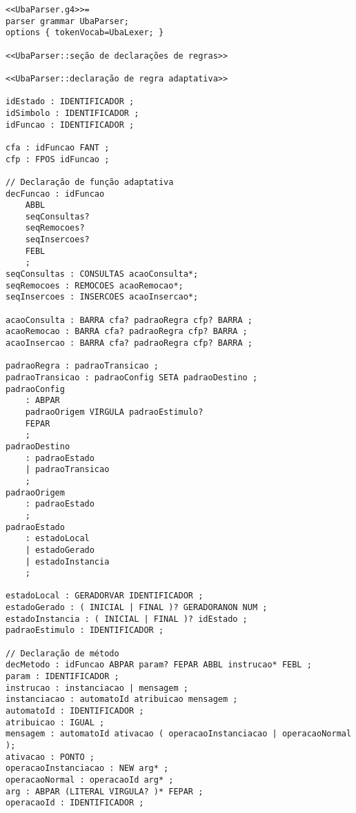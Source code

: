 
\begin{lstlisting}[style=antlr]
<<UbaParser.g4>>=
parser grammar UbaParser;
options { tokenVocab=UbaLexer; }

<<UbaParser::seção de declarações de regras>>

<<UbaParser::declaração de regra adaptativa>>

idEstado : IDENTIFICADOR ;
idSimbolo : IDENTIFICADOR ;
idFuncao : IDENTIFICADOR ;

cfa : idFuncao FANT ;
cfp : FPOS idFuncao ;

// Declaração de função adaptativa
decFuncao : idFuncao
	ABBL
	seqConsultas?
	seqRemocoes?
	seqInsercoes?
	FEBL
	;
seqConsultas : CONSULTAS acaoConsulta*;
seqRemocoes : REMOCOES acaoRemocao*;
seqInsercoes : INSERCOES acaoInsercao*;

acaoConsulta : BARRA cfa? padraoRegra cfp? BARRA ;
acaoRemocao : BARRA cfa? padraoRegra cfp? BARRA ;
acaoInsercao : BARRA cfa? padraoRegra cfp? BARRA ;

padraoRegra : padraoTransicao ;
padraoTransicao : padraoConfig SETA padraoDestino ;
padraoConfig
	: ABPAR
	padraoOrigem VIRGULA padraoEstimulo?
	FEPAR
	;
padraoDestino
	: padraoEstado
	| padraoTransicao
	;
padraoOrigem
	: padraoEstado
	;
padraoEstado
	: estadoLocal
	| estadoGerado
	| estadoInstancia
	;

estadoLocal : GERADORVAR IDENTIFICADOR ;
estadoGerado : ( INICIAL | FINAL )? GERADORANON NUM ;
estadoInstancia : ( INICIAL | FINAL )? idEstado ;
padraoEstimulo : IDENTIFICADOR ;

// Declaração de método
decMetodo : idFuncao ABPAR param? FEPAR ABBL instrucao* FEBL ;
param : IDENTIFICADOR ;
instrucao : instanciacao | mensagem ;
instanciacao : automatoId atribuicao mensagem ;
automatoId : IDENTIFICADOR ;
atribuicao : IGUAL ;
mensagem : automatoId ativacao ( operacaoInstanciacao | operacaoNormal );
ativacao : PONTO ;
operacaoInstanciacao : NEW arg* ;
operacaoNormal : operacaoId arg* ;
arg : ABPAR (LITERAL VIRGULA? )* FEPAR ;
operacaoId : IDENTIFICADOR ;
\end{lstlisting}
